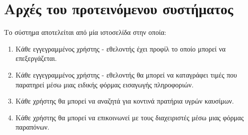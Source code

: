 \section{Αρχές του προτεινόμενου συστήματος}

Το σύστημα αποτελείται από μία ιστοσελίδα στην οποία:
\begin{enumerate}
	\item Κάθε εγγεγραμμένος χρήστης - εθελοντής έχει προφίλ το οποίο μπορεί να επεξεργάζεται.
	\item Κάθε εγγεγραμμένος χρήστης - εθελοντής θα μπορεί να καταγράφει τιμές που παρατηρεί μέσω μιας ειδικής φόρμας εισαγωγής πληροφοριών.
	\item Κάθε χρήστης θα μπορεί να αναζητά για κοντινά πρατήρια υγρών καυσίμων.
  \item Κάθε χρήστης θα μπορεί να επικοινωνεί με τους διαχειριστές μέσω μιας φόρμας παραπόνων.
\end{enumerate}

